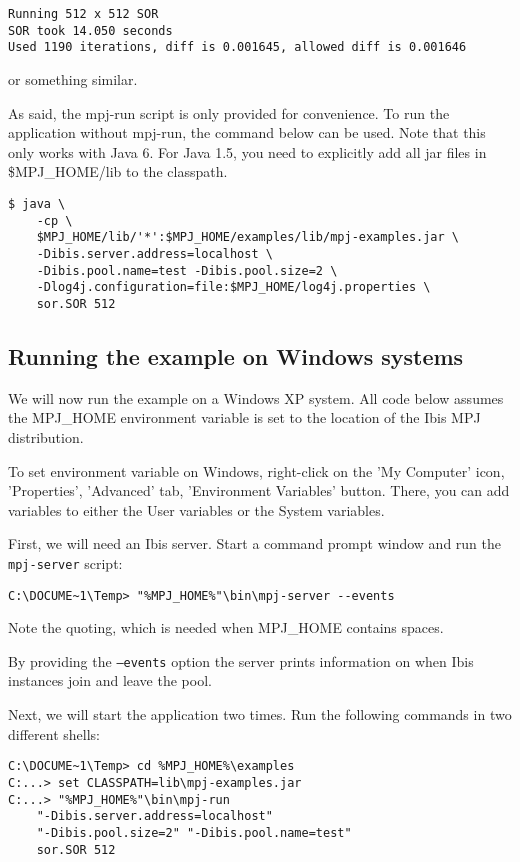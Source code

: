 \documentclass[a4paper,10pt]{article}
\begin{document}
\noindent
{\small
\begin{verbatim}
Running 512 x 512 SOR
SOR took 14.050 seconds
Used 1190 iterations, diff is 0.001645, allowed diff is 0.001646
\end{verbatim}
}
\noindent

or something similar.

As said, the mpj-run script is only provided for convenience. To run
the application without mpj-run, the command below can be used.
Note that this only works with Java 6. For Java 1.5, you need to
explicitly add all jar files in \$MPJ\_HOME/lib to the classpath.

\noindent
{\small
\begin{verbatim}
$ java \
    -cp \
    $MPJ_HOME/lib/'*':$MPJ_HOME/examples/lib/mpj-examples.jar \
    -Dibis.server.address=localhost \
    -Dibis.pool.name=test -Dibis.pool.size=2 \
    -Dlog4j.configuration=file:$MPJ_HOME/log4j.properties \
    sor.SOR 512
\end{verbatim}
}
\noindent

\subsection{Running the example on Windows systems}

We will now run the example on a Windows XP system.
All code below assumes the MPJ\_HOME
environment variable is set to the location of the Ibis MPJ distribution.

To set environment variable on Windows, right-click on the 'My Computer' icon,
'Properties', 'Advanced' tab, 'Environment Variables' button. There, you
can add variables to either the User variables or the System variables.

First, we will need an Ibis server. Start a command prompt window and
run the \texttt{mpj-server} script:
\noindent
{\small
\begin{verbatim}
C:\DOCUME~1\Temp> "%MPJ_HOME%"\bin\mpj-server --events
\end{verbatim}
}
\noindent

Note the quoting, which is needed when MPJ\_HOME contains spaces.

By providing the \texttt{--events} option the server
prints information on when Ibis instances join and leave the pool.

Next, we will start the application two times.
Run the following commands in two different shells:

\noindent
{\small
\begin{verbatim}
C:\DOCUME~1\Temp> cd %MPJ_HOME%\examples
C:...> set CLASSPATH=lib\mpj-examples.jar
C:...> "%MPJ_HOME%"\bin\mpj-run
    "-Dibis.server.address=localhost"
    "-Dibis.pool.size=2" "-Dibis.pool.name=test"
    sor.SOR 512
\end{verbatim}
}
\noindent
\end{document}
